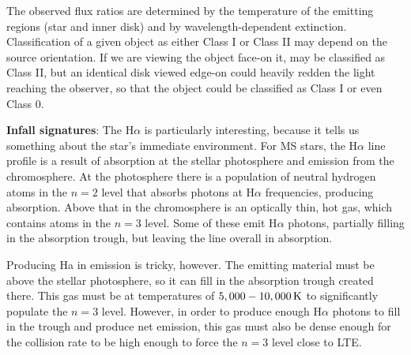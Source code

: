 \documentclass[a4paper,10pt]{article}
\begin{document}
{\noindent}The observed flux ratios are determined by the temperature of the emitting regions (star and inner disk) and by wavelength-dependent extinction. Classification of a given object as either Class I or Class II may depend on the source orientation. If we are viewing the object face-on it, may be classified as Class II, but an identical disk viewed edge-on could heavily redden the light reaching the observer, so that the object could be classified as Class I or even Class 0.

{\noindent}\textbf{Infall signatures}: The H$\alpha$ is particularly interesting, because it tells us something about the star's immediate environment. For MS stars, the H$\alpha$ line profile is a result of absorption at the stellar photosphere and emission from the chromosphere. At the photosphere there is a population of neutral hydrogen atoms in the $n=2$ level that absorbs photons at H$\alpha$ frequencies, producing absorption. Above that in the chromosphere is an optically thin, hot gas, which contains atoms in the $n=3$ level. Some of these emit H$\alpha$ photons, partially filling in the absorption trough, but leaving the line overall in absorption. 

{\noindent}Producing Ha in emission is tricky, however. The emitting material must be above the stellar photosphere, so it can fill in the absorption trough created there. This gas must be at temperatures of $5,000-10,000\,{\rm K}$ to significantly populate the $n=3$ level. However, in order to produce enough H$\alpha$ photons to fill in the trough and produce net emission, this gas must also be dense enough for the collision rate to be high enough to force the $n=3$ level close to LTE. 
\end{document}
